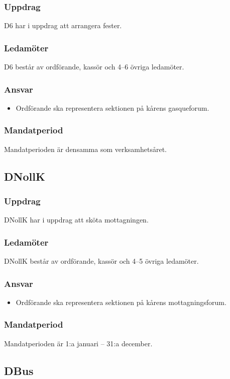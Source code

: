 \subsubsection{Uppdrag}
D6 har i uppdrag att arrangera fester. 
\subsubsection{Ledamöter}
D6 består av ordförande, kassör och 4--6 övriga ledamöter.
\subsubsection{Ansvar}
\begin{itemize}
    \item Ordförande ska representera sektionen på kårens gasqueforum.
\end{itemize}
\subsubsection{Mandatperiod}
Mandatperioden är densamma som verksamhetsåret. 

\subsection{DNollK}
\subsubsection{Uppdrag}
DNollK har i uppdrag att sköta mottagningen. 
\subsubsection{Ledamöter}
DNollK består av ordförande, kassör och 4--5 övriga ledamöter.
\subsubsection{Ansvar}
\begin{itemize}
    \item Ordförande ska representera sektionen på kårens mottagningsforum.
\end{itemize}
\subsubsection{Mandatperiod}
Mandatperioden är 1:a januari – 31:a december.

\subsection{DBus}
